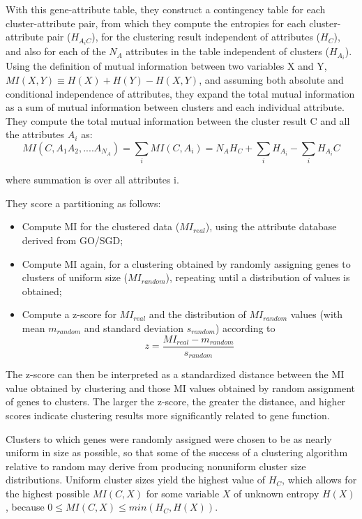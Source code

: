 With this gene-attribute table, they construct a contingency table for each cluster-attribute pair, from which they compute the entropies for each cluster-attribute pair ($H_{A_{i}C}$), 
for the clustering result independent of attributes ($H_{C}$), and also for each of the $N_{A}$ attributes in the table independent of clusters ($H_{A_{i}}$). 
Using the definition of mutual information between two variables X and Y, $MI(X,Y) \equiv H(X)+H(Y)−H(X,Y)$, and assuming both absolute and conditional independence of attributes, 
they expand the total mutual information as a sum of mutual information between clusters and each individual attribute. 
They compute the total mutual information between the cluster result C and all the attributes $A_{i}$ as:
\[
MI(C,A_{1}A_{2},....A_{N_{A}}) = \sum_{i}MI(C,A_{i}) = N_{A}H_{C} + \sum_{i}H_{A_{i}}-\sum_{i}H_{A_{i}}C
\]

where summation is over all attributes i.

They score a partitioning as follows: 
\begin{itemize}
 \item Compute MI for the clustered data ($MI_{real}$), using the attribute database derived from GO/SGD; 
 \item Compute MI again, for a clustering obtained by randomly assigning genes to clusters of uniform size ($MI_{random}$), repeating until a distribution of values is obtained; 
 \item Compute a z-score for $MI_{real}$ and the distribution of $MI_{random}$ values (with mean $m_{random}$ and standard deviation $s_{random}$) according to 
\[
z = \frac{MI_{real}-m_{random}}{s_{random}} 
\]
\end{itemize}

The z-score can then be interpreted as a standardized distance between the MI value obtained by clustering and those MI values obtained by random assignment of genes to clusters. 
The larger the z-score, the greater the distance, and higher scores indicate clustering results more significantly related to gene function.

Clusters to which genes were randomly assigned were chosen to be as nearly uniform in size as possible, so that some of the success of a clustering algorithm relative 
to random may derive from producing nonuniform cluster size distributions. Uniform cluster sizes yield the highest value of $H_{C}$, which allows for the highest 
possible $MI(C,X)$ for some variable $X$ of unknown entropy $H(X)$, because $0 \leq MI(C,X) \leq min(H_{C},H(X))$.

